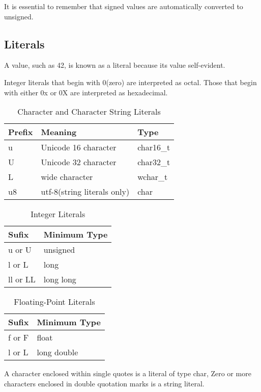 \documentclass[UTF8]{ctexart}
\begin{document}
It is essential to remember that signed values are automatically converted to unsigned.

\subsection{Literals}
A value, such as 42, is known as a literal because its value self-evident.

Integer literals that begin with 0(zero) are interpreted as octal. Those that begin with either 0x or 0X are interpreted as hexadecimal. 

\begin{table}[H]
	\centering
	\begin{tabular}{|l|l|l|}
		\hline
		Prefix & Meaning & Type \\
		\hline
		u & Unicode 16 character & char16\_t \\
		U & Unicode 32 character & char32\_t \\
		L & wide character & wchar\_t \\
		u8 & utf-8(string literals only) & char \\
		\hline
	\end{tabular}%
	\caption*{Character and Character String Literals}
\end{table}

\begin{table}[H]
	\centering
	\begin{tabular}{|l|l|}
		\hline
		Sufix & Minimum Type \\
		\hline
		u or U & unsigned \\
		l or L & long \\
		ll or LL & long long \\
		\hline
	\end{tabular}%
	\caption*{Integer Literals}
\end{table}

\begin{table}[H]
	\centering
	\begin{tabular}{|l|l|}
		\hline
		Sufix & Minimum Type \\
		\hline
		f or F & float \\
		l or L & long double \\
		\hline
	\end{tabular}%
	\caption*{Floating-Point Literals}
\end{table}

A character enclosed within single quotes is a literal of type char, Zero or more characters enclosed in double quotation marks is a string literal.
\end{document}
